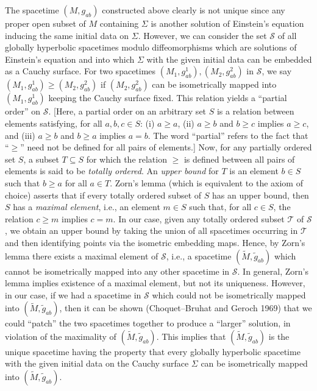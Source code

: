 The spacetime \((M,g_{ab})\) constructed above clearly is not unique since any proper
open subset of \(M\) containing \(\Sigma\) is another solution of Einstein's equation
inducing the same initial data on \(\Sigma\). However, we can consider the set
\(\mathcal S\) of all globally hyperbolic spacetimes modulo diffeomorphisms which are
solutions of Einstein's equation and into which \(\Sigma\) with the given initial data
can be embedded as a Cauchy surface. For two spacetimes
\((M_1,g^1_{ab}),(M_2,g^2_{ab})\) in \(\mathcal S\), we say
\((M_1,g^1_{ab})\geq(M_2,g^2_{ab})\) if \((M_2,g^2_{ab})\) can be isometrically
mapped into \((M_1,g^1_{ab})\) keeping the Cauchy surface fixed. This relation yields
a ``partial order'' on \(\mathcal S\). [Here, a partial order on an arbitrary set \(S\)
is a relation between elements satisfying, for all \(a,b,c\in S\): (i) \(a\geq a\),
(ii) \(a\geq b\) and \(b\geq c\) implies \(a\geq c\), and (iii) \(a\geq b\) and
\(b\geq a\) implies \(a=b\). The word ``partial'' refers to the fact that ``\(\geq\)''
need not be defined for all pairs of elements.] Now, for any partially ordered set \(S\),
a subset \(T\subseteq S\) for which the relation \(\geq\) is defined between all pairs
of elements is said to be \emph{totally ordered}. An \emph{upper bound} for \(T\) is an
element \(b\in S\) such that \(b\geq a\) for all \(a\in T\). Zorn's lemma (which is
equivalent to the axiom of choice) asserts that if every totally ordered subset of \(S\)
has an upper bound, then \(S\) has a \emph{maximal element}, i.e., an element
\(m\in S\) such that, for all \(c\in S\), the relation \(c\geq m\) implies \(c=m\). In
our case, given any totally ordered subset \(\mathcal T\) of \(\mathcal S\), we obtain
an upper bound by taking the union of all spacetimes occurring in \(\mathcal T\) and
then identifying points via the isometric embedding maps. Hence, by Zorn's lemma
there exists a maximal element of \(\mathcal S\), i.e., a spacetime
\((\widetilde M,\widetilde g_{ab})\) which cannot be isometrically mapped into any
other spacetime in \(\mathcal S\). In general, Zorn's lemma implies existence of a
maximal element, but not its uniqueness. However, in our case, if we had a spacetime
in \(\mathcal S\) which could not be isometrically mapped into
\((\widetilde M,\widetilde g_{ab})\), then it can be shown (Choquet--Bruhat and
Geroch 1969) that we could ``patch'' the two spacetimes together to produce a
``larger'' solution, in violation of the maximality of
\((\widetilde M,\widetilde g_{ab})\). This implies that
\((\widetilde M,\widetilde g_{ab})\) is the unique spacetime having the property that
every globally hyperbolic spacetime with the given initial data on the Cauchy surface
\(\Sigma\) can be isometrically mapped into \((\widetilde M,\widetilde g_{ab})\).

